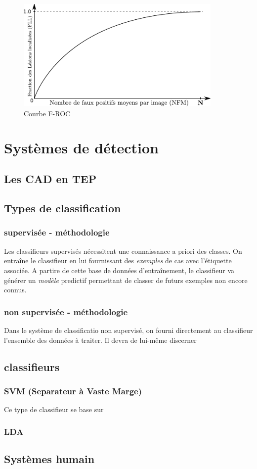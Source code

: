 \begin{figure}[h]
	
	\label{fig:courbeFROC}
	\begin{center}
	\includegraphics[width=10cm]{images/FROC}
	\end{center}
	\caption{Courbe F-ROC}
\end{figure}



\chapter{Systèmes de détection}

	\section{Les CAD en TEP}


	\section{Types de classification}
		\subsection{supervisée - méthodologie}

Les classifieurs supervisés nécessitent une connaissance a priori des classes. On entraîne le classifieur en lui fournissant des \emph{exemples} de cas avec l'étiquette associée. A partire de cette base de données d'entraînement, le classifieur va générer un \emph{modèle} predictif permettant de classer de futurs exemples non encore connus.


		\subsection{non supervisée - méthodologie}

Dans le système de classificatio non supervisé, on fourni directement au classifieur l'ensemble des données à traiter. Il devra de lui-même discerner 
	\section{classifieurs}

		
		\subsection{SVM (Separateur à Vaste Marge)}

Ce type de classifieur se base sur 
		\subsection{LDA}

	\section{Systèmes humain}
